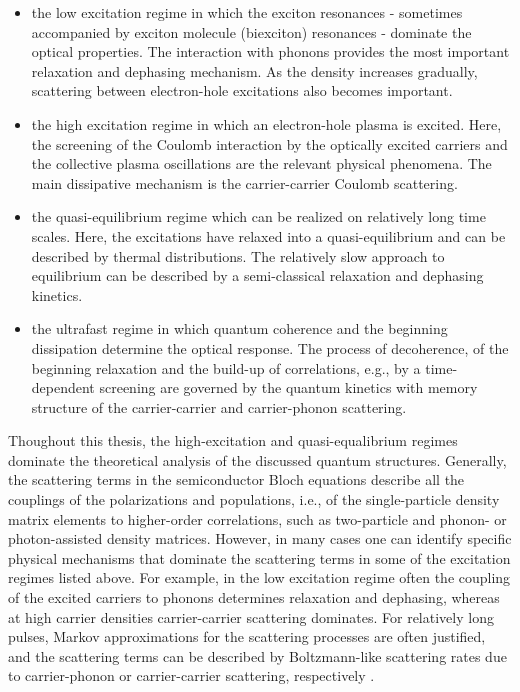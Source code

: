 \begin{itemize}
\item the low excitation regime in which the exciton resonances - sometimes
accompanied by exciton molecule (biexciton) resonances - dominate
the optical properties. The interaction with phonons provides the
most important relaxation and dephasing mechanism. As the density
increases gradually, scattering between electron-hole excitations
also becomes important. 
\item the high excitation regime in which an electron-hole plasma is excited.
Here, the screening of the Coulomb interaction by the optically excited
carriers and the collective plasma oscillations are the relevant physical
phenomena. The main dissipative mechanism is the carrier-carrier Coulomb
scattering. 
\item the quasi-equilibrium regime which can be realized on relatively long
time scales. Here, the excitations have relaxed into a quasi-equilibrium
and can be described by thermal distributions. The relatively slow
approach to equilibrium can be described by a semi-classical relaxation
and dephasing kinetics.
\item the ultrafast regime in which quantum coherence and the beginning
dissipation determine the optical response. The process of decoherence,
of the beginning relaxation and the build-up of correlations, e.g.,
by a time-dependent screening are governed by the quantum kinetics
with memory structure of the carrier-carrier and carrier-phonon scattering.
\end{itemize}
Thoughout this thesis, the high-excitation and quasi-equalibrium regimes
dominate the theoretical analysis of the discussed quantum structures.
Generally, the scattering terms in the semiconductor Bloch equations
describe all the couplings of the polarizations and populations, i.e.,
of the single-particle density matrix elements to higher-order correlations,
such as two-particle and phonon- or photon-assisted density matrices.
However, in many cases one can identify specific physical mechanisms
that dominate the scattering terms in some of the excitation regimes
listed above. For example, in the low excitation regime often the
coupling of the excited carriers to phonons determines relaxation
and dephasing, whereas at high carrier densities carrier-carrier scattering
dominates. For relatively long pulses, Markov approximations for the
scattering processes are often justified, and the scattering terms
can be described by Boltzmann-like scattering rates due to carrier-phonon
or carrier-carrier scattering, respectively \citet{Haug2009}.

